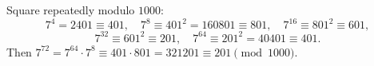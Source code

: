 Square repeatedly modulo $1000$:
\[7^4=2401\equiv401,\quad 7^8\equiv401^2=160801\equiv801,\quad 7^{16}\equiv801^2\equiv601,\]
\[7^{32}\equiv601^2\equiv201,\quad 7^{64}\equiv201^2=40401\equiv401.\]
Then $7^{72}=7^{64}\cdot7^8\equiv401\cdot801=321201\equiv\boxed{201}\pmod{1000}$.
